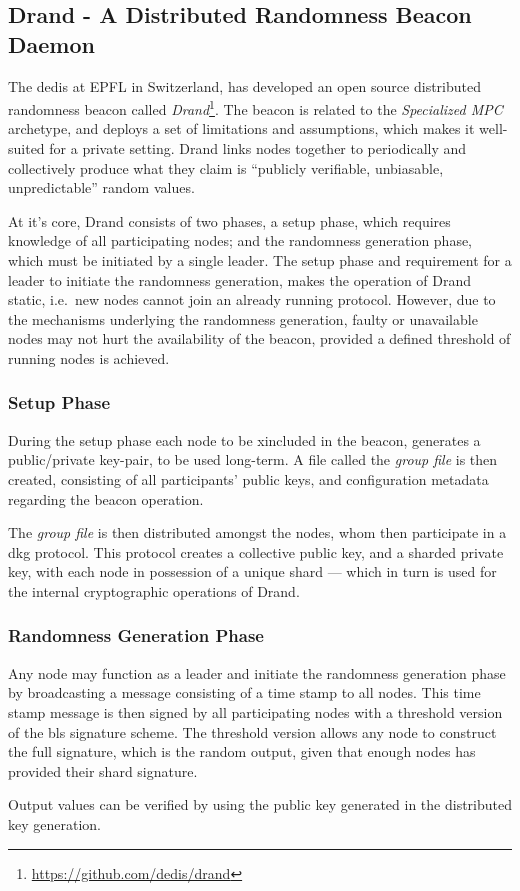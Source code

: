 \subsection{Drand - A Distributed Randomness Beacon Daemon}
\label{sub:drand_a_distributed_randomness_beacon_daemon}
The \gls{dedis} at EPFL in Switzerland, has developed an open source distributed randomness beacon called \textit{Drand}\footnote{\url{https://github.com/dedis/drand}}.
The beacon is related to the \textit{Specialized MPC} archetype, and deploys a set of limitations and assumptions, which makes it well-suited for a private setting.
Drand links nodes together to periodically and collectively produce what they claim is \enquote{publicly verifiable, unbiasable, unpredictable} random values.

At it's core, Drand consists of two phases, a setup phase, which requires knowledge of all participating nodes; and the randomness generation phase, which must be initiated by a single leader.
The setup phase and requirement for a leader to initiate the randomness generation, makes the operation of Drand static, i.e.\ new nodes cannot join an already running protocol.
However, due to the mechanisms underlying the randomness generation, faulty or unavailable nodes may not hurt the availability of the beacon, provided a defined threshold of running nodes is achieved.

\subsubsection{Setup Phase}
During the setup phase each node to be xincluded in the beacon, generates a public/private key-pair, to be used long-term.
A file called the \textit{group file} is then created, consisting of all participants' public keys, and configuration metadata regarding the beacon operation.

The \textit{group file} is then distributed amongst the nodes, whom then participate in a \gls{dkg} protocol.
This protocol creates a collective public key, and a sharded private key, with each node in possession of a unique shard --- which in turn is used for the internal cryptographic operations of Drand.

\subsubsection{Randomness Generation Phase}
Any node may function as a leader and initiate the randomness generation phase by broadcasting a message consisting of a time stamp to all nodes.
This time stamp message is then signed by all participating nodes with a threshold version of the \gls{bls} signature scheme.
The threshold version allows any node to construct the full signature, which is the random output, given that enough nodes has provided their shard signature.

Output values can be verified by using the public key generated in the distributed key generation.
